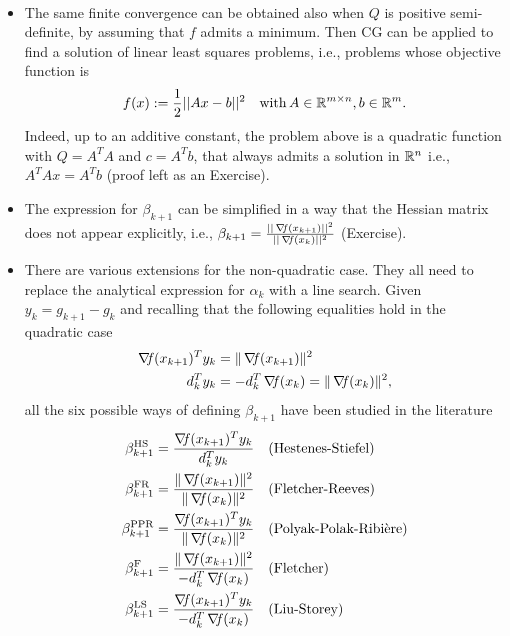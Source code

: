 \documentclass[10pt,a4paper]{article}
\begin{document}
\begin{remark} $\;$\\
	\vspace{-5mm}
	\begin{itemize}
		\item The same finite convergence can be obtained also when $Q$ is positive semi-definite, by assuming that $f$ admits a minimum. %
		Then CG can be applied to find a solution of linear least squares problems, i.e., problems whose objective function is
		$$ f(x):= \frac{1}{2} ||Ax-b||^2 \quad \mathord{\mathrm{with }}\, A\in \mathbb{R}^{m\times n}, b\in \mathbb{R}^m.$$
		Indeed, up to an additive constant, the problem above is a quadratic function with $Q=A^TA$ and $c=A^Tb$, that always admits a solution in $\mathbb{R}^n$ i.e., $A^TA x =A^Tb$ (proof left as an Exercise). %
		\item The expression for $\beta_{k+1}$ can be simplified in a way that the Hessian matrix does not appear explicitly, i.e., $\beta_{k+1} =\frac{||\operatorname*{\mathit{\nabla \!f}}(x_{k+1})||^2}{||\operatorname*{\mathit{\nabla \!f}}(x_k)||^2}$ (Exercise). %
		\item There are various extensions for the non-quadratic case. They all need to replace the analytical expression for $\alpha_k$ with a line search. Given $y_k = g_{k+1} - g_k$ and recalling that the following equalities hold in the quadratic case
		\begin{align*}
			\operatorname*{\mathit{\nabla \!f}}(x_{k+1})^T y_k &= \|\operatorname*{\mathit{\nabla \!f}}(x_{k+1})\|^2\\
			d_k^T y_k &= -d_k^T \operatorname*{\mathit{\nabla \!f}}(x_k) = \|\operatorname*{\mathit{\nabla \!f}}(x_k)\|^2,
		\end{align*}
		all the six possible ways of defining $\beta_{k+1}$ have been studied in the literature
		\begin{align*}
			\beta_{k+1}^{\text{HS}} &= \frac{\grad(x_{k+1})^T y_k}{d_k^T y_k} &&\text{(Hestenes-Stiefel)} \\
			\beta_{k+1}^{\text{FR}} &= \frac{\|\grad(x_{k+1})\|^2}{\|\grad(x_k)\|^2} &&\text{(Fletcher-Reeves)} \\
			\beta_{k+1}^{\text{PPR}} &= \frac{\grad(x_{k+1})^T y_k}{\|\grad(x_k)\|^2} &&\text{(Polyak-Polak-Ribière)} \\
			\beta_{k+1}^{\text{F}} &= \frac{\|\grad(x_{k+1})\|^2}{-d_k^T \grad(x_k)} &&\text{(Fletcher)} \\
			\beta_{k+1}^{\text{LS}} &= \frac{\grad(x_{k+1})^T y_k}{-d_k^T \grad(x_k)} &&\text{(Liu-Storey)} \\

\end{align*}
\end{itemize}
\end{remark}
\end{document}
